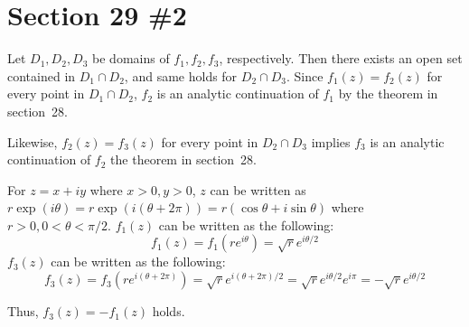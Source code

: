 \documentclass{scrartcl}
\begin{document}
\section{Section 29 \#2}
Let \(D_1, D_2, D_3\) be domains of \(f_1, f_2, f_3\), respectively.
Then there exists an open set contained in \(D_1 \cap D_2\), and same holds for \(D_2 \cap D_3\).
Since \(f_1(z) = f_2(z)\) for every point in \(D_1 \cap D_2\), \(f_2\) is an analytic continuation of \(f_1\) by the theorem in section~28.

Likewise, \(f_2(z) = f_3(z)\) for every point in \(D_2 \cap D_3\) implies \(f_3\) is an analytic continuation of \(f_2\) the theorem in section~28.

For \(z = x + iy\) where \(x > 0, y > 0\), \(z\) can be written as \(r\exp(i\theta) = r\exp(i(\theta + 2\pi)) = r(\cos\theta + i\sin\theta)\) where \(r > 0, 0 < \theta < \pi / 2\).
\(f_1(z)\) can be written as the following:
\[
  f_1(z) = f_1(re^{i\theta}) = \sqrt{r}e^{i\theta / 2}
\]
\(f_3(z)\) can be written as the following:
\[
  f_3(z) = f_3(re^{i(\theta + 2\pi)}) = \sqrt{r}e^{i(\theta + 2\pi) / 2} = \sqrt{r}e^{i\theta / 2}e^{i\pi} = -\sqrt{r}e^{i\theta / 2}
\]

Thus, \(f_3(z) = -f_1(z)\) holds.
\end{document}
